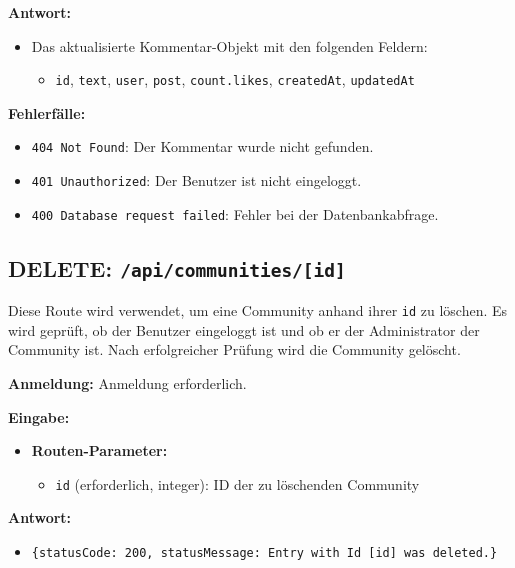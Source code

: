 \documentclass[a4paper,12pt]{article}
\begin{document}
\textbf{Antwort:}
\begin{itemize}
    \item Das aktualisierte Kommentar-Objekt mit den folgenden Feldern:
    \begin{itemize}
        \item \texttt{id},
              \texttt{text},
              \texttt{user},
              \texttt{post},
              \texttt{count.likes},
              \texttt{createdAt},
              \texttt{updatedAt}
    \end{itemize}
\end{itemize}

\textbf{Fehlerfälle:}
\begin{itemize}
    \item \texttt{404 Not Found}:
        Der Kommentar wurde nicht gefunden.
    \item \texttt{401 Unauthorized}:
        Der Benutzer ist nicht eingeloggt.
    \item \texttt{400 Database request failed}:
        Fehler bei der Datenbankabfrage.
\end{itemize}

\newpage
\subsection{DELETE: \texttt{/api/communities/[id]}}

Diese Route wird verwendet, um eine Community anhand ihrer \texttt{id} zu
löschen. Es wird geprüft, ob der Benutzer eingeloggt ist und ob er der
Administrator der Community ist. Nach erfolgreicher Prüfung wird die Community
gelöscht.

\textbf{Anmeldung:} Anmeldung erforderlich.

\textbf{Eingabe:}
\begin{itemize}
    \item \textbf{Routen-Parameter:}
    \begin{itemize}
        \item \texttt{id} (erforderlich, integer):
            ID der zu löschenden Community
    \end{itemize}
\end{itemize}

\textbf{Antwort:}
\begin{itemize}
    \item \texttt{\{statusCode: 200,
        statusMessage: Entry with Id [id] was deleted.\}}
\end{itemize}
\end{document}
